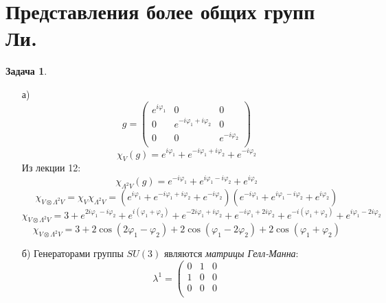 \documentclass[12pt]{article}
\theoremstyle{definition}
\newtheorem{zad}{Задача}[section]
\begin{document}
\section{Представления более общих групп Ли.}
\begin{zad}
\begin{itemize}
    \item[а)]
    \begin{equation}
        g=\left(
    \begin{array}{cccccc}
    e^{i\varphi_1} & 0 & 0\\
    0 & e^{-i\varphi_1+i\varphi_2} & 0\\
    0 & 0 & e^{-i\varphi_2}\\
    \end{array}
    \right)
    \end{equation}
    \begin{equation}
        \chi_V(g)=e^{i\varphi_1}+e^{-i\varphi_1+i\varphi_2}+e^{-i\varphi_2}
    \end{equation}
    Из лекции 12:
    \begin{equation}
        \chi_{\Lambda^2V}(g)=e^{-i\varphi_1}+e^{i\varphi_1-i\varphi_2}+e^{i\varphi_2}
    \end{equation}
    \begin{equation}
        \chi_{V\otimes\Lambda^2V}=\chi_V\chi_{\Lambda^2V}=(e^{i\varphi_1}+e^{-i\varphi_1+i\varphi_2}+e^{-i\varphi_2})(e^{-i\varphi_1}+e^{i\varphi_1-i\varphi_2}+e^{i\varphi_2})
    \end{equation}
    \begin{equation}
        \chi_{V\otimes\Lambda^2V}=3+e^{2i\varphi_1-i\varphi_2}+e^{i(\varphi_1+\varphi_2)}+e^{-2i\varphi_1+i\varphi_2}+e^{-i\varphi_1+2i\varphi_2}+e^{-i(\varphi_1+\varphi_2)}+e^{i\varphi_1-2i\varphi_2}
    \end{equation}
    \begin{equation}
        \boxed{\chi_{V\otimes\Lambda^2V}=3+2\cos(2\varphi_1-\varphi_2)+2\cos(\varphi_1-2\varphi_2)+2\cos(\varphi_1+\varphi_2)}
    \end{equation}
    \item[б)] Генераторами группы $SU(3)$ являются \textit{матрицы Гелл-Манна}:
    \begin{equation}
        \lambda^1=\left(
    \begin{array}{ccc}
    0 & 1 & 0\\
    1 & 0 & 0\\
    0 & 0 & 0\\
    \end{array}

\end{equation}
\end{itemize}
\end{zad}
\end{document}
